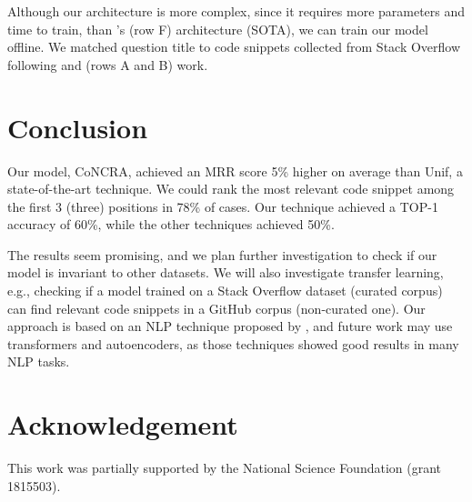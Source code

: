 \documentclass[sigconf]{acmart}
\begin{document}
Although our architecture is more complex, since it requires more parameters and time to train, than \citet{cambronero-deep-code-search-2019}'s (row F) architecture (SOTA), we can train our model offline. We matched question title to code snippets collected from Stack Overflow following \citet{Allamanis-bimodal-source-code-natural-language:2015} and \citet{iyer-etal-2016-summarizing} (rows A and B) work. 

\section{Conclusion}

Our model, CoNCRA, achieved an MRR score 5\% higher on average than Unif, a state-of-the-art technique. We could rank the most relevant code snippet among the first 3 (three) positions in 78\% of cases. Our technique achieved a TOP-1 accuracy of 60\%, while the other techniques achieved 50\%. 

The results seem promising, and we plan further investigation to check if our model is invariant to other datasets. We will also investigate transfer learning, e.g., checking if a model trained on a Stack Overflow dataset (curated corpus) can find relevant code snippets in a GitHub corpus (non-curated one). Our approach is based on an NLP technique proposed by \citet{feng-2015}, and future work may use transformers and autoencoders, as those techniques showed good results in many NLP tasks. 
\section{Acknowledgement}
This work was partially supported by the National Science Foundation (grant 1815503).




\end{document}

